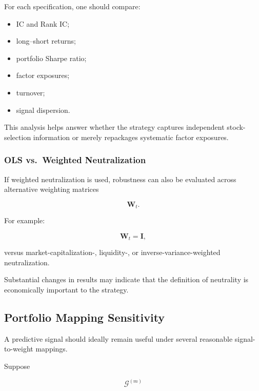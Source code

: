 \documentclass[11pt,a4paper]{article}
\begin{document}
For each specification, one should compare:

\begin{itemize}
    \item IC and Rank IC;
    \item long--short returns;
    \item portfolio Sharpe ratio;
    \item factor exposures;
    \item turnover;
    \item signal dispersion.
\end{itemize}

This analysis helps answer whether the strategy captures independent
stock-selection information or merely repackages systematic factor exposures.


\subsubsection{OLS vs.\ Weighted Neutralization}

If weighted neutralization is used, robustness can also be evaluated across
alternative weighting matrices

\begin{equation}
\mathbf{W}_t.
\end{equation}

For example:

\begin{equation}
\mathbf{W}_t
=
\mathbf{I},
\end{equation}

versus market-capitalization-, liquidity-, or inverse-variance-weighted
neutralization.

Substantial changes in results may indicate that the definition of neutrality
is economically important to the strategy.


\subsection{Portfolio Mapping Sensitivity}
\label{subsec:portfolio_mapping_sensitivity}

A predictive signal should ideally remain useful under several reasonable
signal-to-weight mappings.

Suppose

\begin{equation}
\mathcal{G}^{(m)}
\end{equation}
\end{document}
